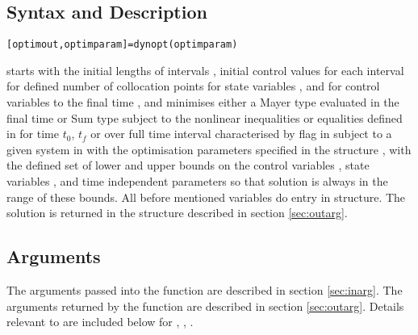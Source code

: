 \subsection{Syntax and Description}
\label{sec:fundessyndes}
 
\begin{verbatim} 
[optimout,optimparam]=dynopt(optimparam)
\end{verbatim} 
starts with the initial lengths of intervals , initial
control values for each interval  for defined number of
collocation points for state variables , and for control
variables  to the final time , and minimises
either a Mayer type  evaluated in the final time or Sum type
 subject to the nonlinear inequalities or equalities
defined in  for time $t_0$, $t_f$ or over full time
interval characterised by flag in  subject to a given
system in  with the optimisation parameters specified
in the structure , with the defined set of lower and
upper bounds on the control variables , state variables
, and time independent parameters  so that
solution is always in the range of these bounds. All before mentioned
variables do entry  in  structure. The
solution is returned in the  structure described in
section \ref{sec:outarg}.   

\subsection{Arguments}
\label{sec:fundesarg}

The arguments passed into the function are described in section
\ref{sec:inarg}. The arguments returned by the function are described
in section \ref{sec:outarg}. Details relevant to  are
included below for , , . 

